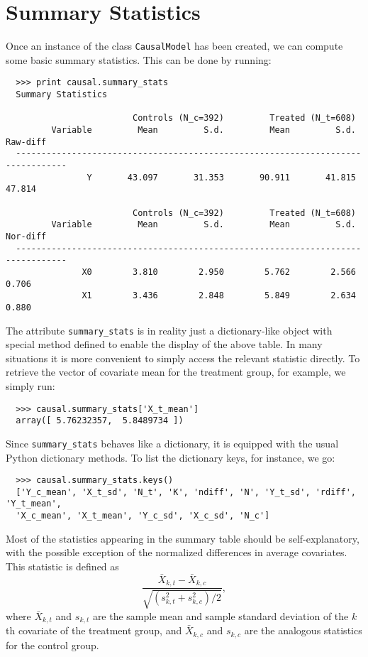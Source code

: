\documentclass[12pt]{article}
\theoremstyle{definition}
\theoremstyle{definition}
\theoremstyle{definition}
\theoremstyle{remark}
\begin{document}
\section*{Summary Statistics}

Once an instance of the class \texttt{CausalModel} has been created, we can compute some basic summary statistics. This can be done by running:

\begin{verbatim}
  >>> print causal.summary_stats
  Summary Statistics
  
                         Controls (N_c=392)         Treated (N_t=608)             
         Variable         Mean         S.d.         Mean         S.d.     Raw-diff
  --------------------------------------------------------------------------------
                Y       43.097       31.353       90.911       41.815       47.814
  
                         Controls (N_c=392)         Treated (N_t=608)             
         Variable         Mean         S.d.         Mean         S.d.     Nor-diff
  --------------------------------------------------------------------------------
               X0        3.810        2.950        5.762        2.566        0.706
               X1        3.436        2.848        5.849        2.634        0.880
\end{verbatim}

The attribute \texttt{summary\_stats} is in reality just a dictionary-like object with special method defined to enable the display of the above table. In many situations it is more convenient to simply access the relevant statistic directly. To retrieve the vector of covariate mean for the treatment group, for example, we simply run:

\begin{verbatim}
  >>> causal.summary_stats['X_t_mean']
  array([ 5.76232357,  5.8489734 ])
\end{verbatim}

Since \texttt{summary\_stats} behaves like a dictionary, it is equipped with the usual Python dictionary methods. To list the dictionary keys, for instance, we go:

\begin{verbatim}
  >>> causal.summary_stats.keys()
  ['Y_c_mean', 'X_t_sd', 'N_t', 'K', 'ndiff', 'N', 'Y_t_sd', 'rdiff', 'Y_t_mean',
  'X_c_mean', 'X_t_mean', 'Y_c_sd', 'X_c_sd', 'N_c']
\end{verbatim}

Most of the statistics appearing in the summary table should be self-explanatory, with the possible exception of the normalized differences in average covariates. This statistic is defined as
\[\frac{\bar{X}_{k,t} - \bar{X}_{k,c}}{\sqrt{\left(s^2_{k,t}+s^2_{k,c}\right)\Big/ 2}},\]
where $\bar{X}_{k,t}$ and $s_{k,t}$ are the sample mean and sample standard deviation of the $k$th covariate of the treatment group, and $\bar{X}_{k,c}$ and $s_{k,c}$ are the analogous statistics for the control group.
\end{document}
